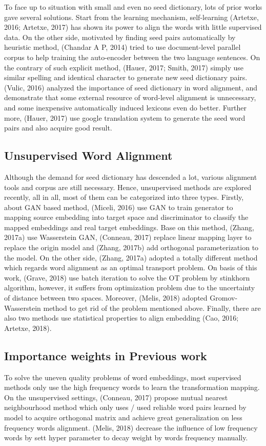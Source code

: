 To face up to situation with small and even no seed dictionary, lots of prior works gave several solutions. Start from the learning mechanism, self-learning (Artetxe, 2016; Artetxe, 2017) has shown its power to align the words with little supervised data. On the other side, motivated by finding seed pairs automatically by heuristic method, (Chandar A P, 2014) tried to use document-level parallel corpus to help training the auto-encoder between the two language sentences. On the contrary of such explicit method, (Hauer, 2017; Smith, 2017) simply use similar spelling and identical character to generate new seed dictionary pairs. (Vulic, 2016) analyzed the importance of seed dictionary in word alignment, and demonstrate that some external resource of word-level alignment is unnecessary, and some inexpensive automatically induced lexicons even do better. Further more, (Hauer, 2017) use google translation system to generate the seed word pairs and also acquire good result.


\subsection{Unsupervised Word Alignment}
Although the demand for seed dictionary has descended a lot, various alignment tools and corpus are still necessary. Hence, unsupervised methods are explored recently, all in all, most of them can be categorized into three types. Firstly, about GAN based method, (Miceli, 2016) use GAN to train generator to mapping source embedding into target space and discriminator to classify the mapped embeddings and real target embeddings. Base on this method, (Zhang, 2017a) use Wasserstein GAN, (Conneau, 2017) replace linear mapping layer to replace the origin model and (Zhang, 2017b) add orthogonal parameterization to the model. On the other side, (Zhang, 2017a) adopted a totally different method which regards word alignment as an optimal transport problem. On basis of this work, (Grave, 2018) use batch iteration to solve the OT problem by stinkhorn algorithm, however, it suffers from optimization problem due to the uncertainty of distance between two spaces. Moreover, (Melis, 2018) adopted Gromov-Wasserstein method to get rid of the problem mentioned above. Finally, there are also two methods use statistical properties to align embedding (Cao, 2016; Artetxe, 2018). 


\subsection{Importance weights in Previous work}
To solve the uneven quality problems of word embeddings, most supervised methods only use the high frequency words to learn the transformation mapping. On the unsupervised settings, (Conneau, 2017) propose mutual nearest neighbourhood method which only uses / used reliable word pairs learned by model to acquire orthogonal matrix and achieve great generalization on less frequency words alignment. (Melis, 2018) decrease the influence of low frequency words by sett hyper parameter to decay weight by words frequency manually. 


		



